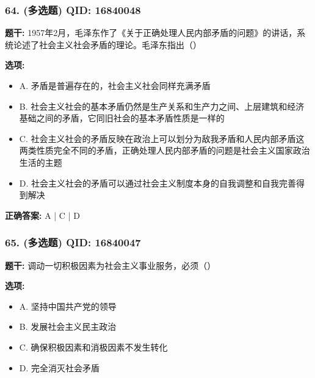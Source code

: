 \documentclass[12pt,UTF8]{ctexart}
\begin{document}
\vspace{0.3em}\hrulefill\vspace{0.7em}

\subsubsection*{64. (多选题) \small QID: 16840048}

\textbf{题干:}
1957年2月，毛泽东作了《关于正确处理人民内部矛盾的问题》的讲话，系统论述了社会主义社会矛盾的理论。毛泽东指出（）

\textbf{选项:}
\begin{itemize}[leftmargin=*]

  \item A. 矛盾是普遍存在的，社会主义社会同样充满矛盾

  \item B. 社会主义社会的基本矛盾仍然是生产关系和生产力之间、上层建筑和经济基础之间的矛盾，它同旧社会的基本矛盾性质是一样的

  \item C. 社会主义社会的矛盾反映在政治上可以划分为敌我矛盾和人民内部矛盾这两类性质完全不同的矛盾，正确处理人民内部矛盾的问题是社会主义国家政治生活的主题

  \item D. 社会主义社会的矛盾可以通过社会主义制度本身的自我调整和自我完善得到解决

\end{itemize}

\textbf{正确答案:}
A | C | D

\vspace{0.3em}\hrulefill\vspace{0.7em}

\subsubsection*{65. (多选题) \small QID: 16840047}

\textbf{题干:}
调动一切积极因素为社会主义事业服务，必须（）

\textbf{选项:}
\begin{itemize}[leftmargin=*]

  \item A. 坚持中国共产党的领导

  \item B. 发展社会主义民主政治

  \item C. 确保积极因素和消极因素不发生转化

  \item D. 完全消灭社会矛盾

\end{itemize}
\end{document}
